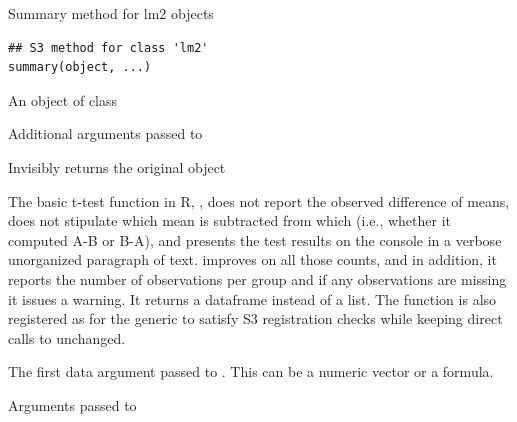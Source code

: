 \documentclass[a4paper]{book}
\begin{document}
%
\begin{Description}
Summary method for lm2 objects
\end{Description}
%
\begin{Usage}
\begin{verbatim}
## S3 method for class 'lm2'
summary(object, ...)
\end{verbatim}
\end{Usage}
%
\begin{Arguments}
\begin{ldescription}
\item[\code{object}] An object of class 

\item[\code{...}] Additional arguments passed to 
\end{ldescription}
\end{Arguments}
%
\begin{Value}
Invisibly returns the original object
\end{Value}
%
\begin{Description}
The basic t-test function in R, , does not report 
the observed difference of means, does not stipulate which mean
is subtracted from which (i.e., whether it computed A-B or B-A), and
presents the test results on the console in a verbose unorganized 
paragraph of text.  improves on all those counts, and 
in addition, it reports the number of observations per group and if any observations 
are missing it issues a warning. It returns a dataframe instead of a list.
The function is also registered as  for the 
generic to satisfy S3 registration checks while keeping direct calls to
 unchanged.
\end{Description}
%
\begin{Arguments}
\begin{ldescription}
\item[\code{x}] The first data argument passed to . This can
be a numeric vector or a formula.

\item[\code{...}] Arguments passed to 
\end{ldescription}
\end{Arguments}
%
\end{document}

